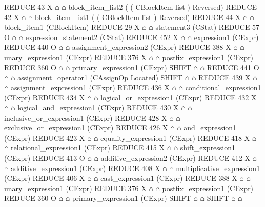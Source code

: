 \begin{isabellebody}
\begin{isamarkuptext}
\begin{isar}
             REDUCE 43 X $\house$ $\house$ block_item_list2  ( ( CBlockItem list )  Reversed) 
              REDUCE 42 X $\house$ $\house$ block_item_list1  ( ( CBlockItem list )  Reversed) 
              REDUCE 44 X $\house$ $\house$ block_item1  (CBlockItem) 
               REDUCE 29 X $\house$ $\house$ statement3  (CStat) 
                REDUCE 57 O $\house$ $\house$ expression_statement2  (CStat) 
                 REDUCE 452 X $\house$ $\house$ expression1  (CExpr) 
                  REDUCE 440 O $\house$ $\house$ assignment_expression2  (CExpr) 
                   REDUCE 388 X $\house$ $\house$ unary_expression1  (CExpr) 
                    REDUCE 376 X $\house$ $\house$ postfix_expression1  (CExpr) 
                     REDUCE 360 O $\house$ $\house$ primary_expression1  (CExpr) 
                      SHIFT $\house$ $\house$ 
                   REDUCE 441 O $\house$ $\house$ assignment_operator1  (CAssignOp Located) 
                    SHIFT $\house$ $\house$ 
                   REDUCE 439 X $\house$ $\house$ assignment_expression1  (CExpr) 
                    REDUCE 436 X $\house$ $\house$ conditional_expression1  (CExpr) 
                     REDUCE 434 X $\house$ $\house$ logical_or_expression1  (CExpr) 
                      REDUCE 432 X $\house$ $\house$ logical_and_expression1  (CExpr) 
                       REDUCE 430 X $\house$ $\house$ inclusive_or_expression1  (CExpr) 
                        REDUCE 428 X $\house$ $\house$ exclusive_or_expression1  (CExpr) 
                         REDUCE 426 X $\house$ $\house$ and_expression1  (CExpr) 
                          REDUCE 423 X $\house$ $\house$ equality_expression1  (CExpr) 
                           REDUCE 418 X $\house$ $\house$ relational_expression1  (CExpr) 
                            REDUCE 415 X $\house$ $\house$ shift_expression1  (CExpr) 
                             REDUCE 413 O $\house$ $\house$ additive_expression2  (CExpr) 
                              REDUCE 412 X $\house$ $\house$ additive_expression1  (CExpr) 
                               REDUCE 408 X $\house$ $\house$ multiplicative_expression1  (CExpr) 
                                REDUCE 406 X $\house$ $\house$ cast_expression1  (CExpr) 
                                 REDUCE 388 X $\house$ $\house$ unary_expression1  (CExpr) 
                                  REDUCE 376 X $\house$ $\house$ postfix_expression1  (CExpr) 
                                   REDUCE 360 O $\house$ $\house$ primary_expression1  (CExpr) 
                                    SHIFT $\house$ $\house$ 
                              SHIFT $\house$ $\house$ 

\end{isar}
\end{isamarkuptext}
\end{isabellebody}
